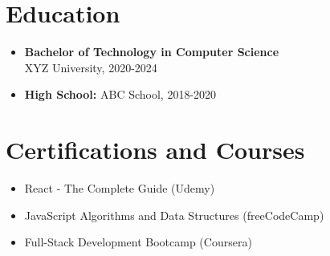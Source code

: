 \documentclass[a4paper,10pt]{article}
\begin{document}
\begin{multicols}{2}
\section*{Education}
\begin{itemize}[leftmargin=*]
    \item \textbf{Bachelor of Technology in Computer Science} \\
        XYZ University, 2020-2024
    \item \textbf{High School:} ABC School, 2018-2020
\end{itemize}

\section*{Certifications and Courses}
\begin{itemize}[leftmargin=*]
    \item React - The Complete Guide (Udemy)
    \item JavaScript Algorithms and Data Structures (freeCodeCamp)
    \item Full-Stack Development Bootcamp (Coursera)
\end{itemize}

\end{multicols}
\end{document}
